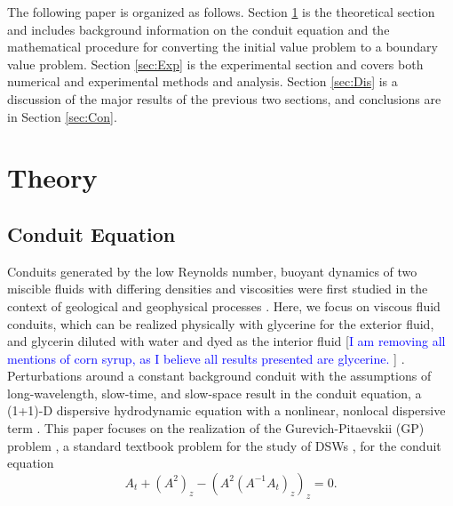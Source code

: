 \documentclass{jfm}
\newcommand{\MM}[1]{[\textcolor{blue}{#1 }]}
\begin{document}
The following paper is organized as follows. Section \ref{sec:Theory} is the theoretical section and includes background information on the conduit equation and the mathematical procedure for converting the initial value problem to a boundary value problem. Section \ref{sec:Exp} is the experimental section and covers both numerical and experimental methods and analysis. Section \ref{sec:Dis} is a discussion of the major results of the previous two sections, and conclusions are in Section \ref{sec:Con}.

\section{Theory}\label{sec:Theory}
\subsection{Conduit Equation}
Conduits generated by the low Reynolds number, buoyant dynamics of two miscible fluids with differing densities and viscosities were first studied in the context of geological and geophysical processes \cite{whitehead_dynamics_1975}.
Here, we focus on viscous fluid conduits, which can be realized physically with glycerine for the exterior fluid, and glycerin diluted with water and dyed as the interior fluid \MM{I am removing all mentions of corn syrup, as I believe all results presented are glycerine.} \cite{olson_solitary_1986,scott_observations_1986,whitehead_wave_1988,maiden_observation_2016}.
Perturbations around a constant background conduit with the assumptions of long-wavelength, slow-time, and slow-space result in the conduit equation, a (1+1)-D dispersive hydrodynamic equation with a nonlinear, nonlocal dispersive term \cite{lowman_dispersive_2013}.
This paper focuses on the realization of the Gurevich-Pitaevskii (GP) problem \cite{gurevich_nonstationary_1974}, a standard textbook problem for the study of DSWs \cite{el_dispersive_2016}, for the conduit equation
\begin{equation}\label{eq:conduit}
  A_t + (A^2)_z -(A^2(A^{-1}A_t)_z)_z = 0.
\end{equation}
\end{document}
